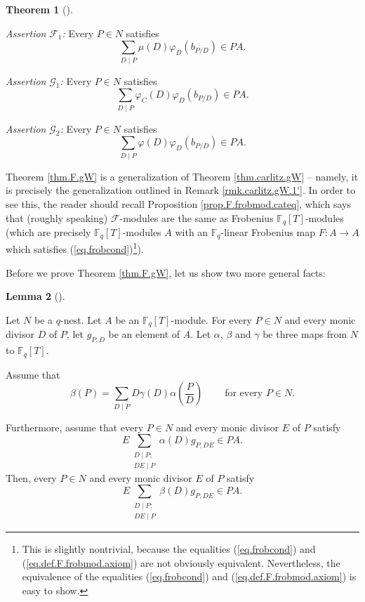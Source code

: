 \documentclass[numbers=enddot,12pt,final,onecolumn,notitlepage]{scrartcl}%
\theoremstyle{definition}
\newtheorem{theo}{Theorem}[section]
\newenvironment{theorem}[1][]
{\begin{theo}[#1]\begin{leftbar}}
{\end{leftbar}\end{theo}}
\newtheorem{lem}[theo]{Lemma}
\newenvironment{lemma}[1][]
{\begin{lem}[#1]\begin{leftbar}}
{\end{leftbar}\end{lem}}
\let\sumnonlimits\sum
\renewcommand{\sum}{\sumnonlimits\limits}
\begin{document}
\begin{theorem}
\textit{Assertion }$\mathcal{F}_{1}$\textit{:} Every $P\in N$ satisfies%
\[
\sum_{D\mid P}\mu\left(  D\right)  \varphi_{D}\left(  b_{P / D}\right)  \in
PA.
\]


\textit{Assertion }$\mathcal{G}_{1}$\textit{:} Every $P\in N$ satisfies%
\[
\sum_{D\mid P}\varphi_{C}\left(  D\right)  \varphi_{D}\left(  b_{P /
D}\right)  \in PA.
\]


\textit{Assertion }$\mathcal{G}_{2}$\textit{:} Every $P\in N$ satisfies%
\[
\sum_{D\mid P}\varphi\left(  D\right)  \varphi_{D}\left(  b_{P/D}\right)  \in
PA.
\]

\end{theorem}

Theorem \ref{thm.F.gW} is a generalization of Theorem \ref{thm.carlitz.gW} --
namely, it is precisely the generalization outlined in Remark
\ref{rmk.carlitz.gW.1'}. In order to see this, the reader should recall
Proposition \ref{prop.F.frobmod.cateq}, which says that (roughly speaking)
$\mathcal{F}$-modules are the same as Frobenius $\mathbb{F}_{q}\left[
T\right]  $-modules (which are precisely $\mathbb{F}_{q}\left[  T\right]
$-modules $A$ with an $\mathbb{F}_{q}$-linear Frobenius map $F:A\rightarrow A$
which satisfies (\ref{eq.frobcond})\footnote{This is slightly nontrivial,
because the equalities (\ref{eq.frobcond}) and (\ref{eq.def.F.frobmod.axiom})
are not obviously equivalent. Nevertheless, the equivalence of the equalities
(\ref{eq.frobcond}) and (\ref{eq.def.F.frobmod.axiom}) is easy to show.}).

Before we prove Theorem \ref{thm.F.gW}, let us show two more general facts:

\begin{lemma}
\label{lem.F.gW.F-G-gen0}Let $N$ be a $q$-nest. Let $A$ be an $\mathbb{F}%
_{q}\left[  T\right]  $-module. For every $P\in N$ and every monic divisor $D$
of $P$, let $g_{P,D}$ be an element of $A$. Let $\alpha$, $\beta$ and $\gamma$
be three maps from $N$ to $\mathbb{F}_{q}\left[  T\right]  $.

Assume that
\begin{equation}
\beta\left(  P\right)  =\sum_{D\mid P}D\gamma\left(  D\right)  \alpha\left(
\dfrac{P}{D}\right)  \ \ \ \ \ \ \ \ \ \ \text{for every }P\in N.
\label{eq.lem.F.gW.F-gen0.beta-through-alpha}%
\end{equation}


Furthermore, assume that every $P\in N$ and every monic divisor $E$ of $P$
satisfy%
\begin{equation}
E\sum_{\substack{D\mid P;\\DE\mid P}}\alpha\left(  D\right)  g_{P,DE}\in PA.
\label{eq.lem.F.gW.F-G-gen0.ass}%
\end{equation}
Then, every $P\in N$ and every monic divisor $E$ of $P$ satisfy%
\begin{equation}
E\sum_{\substack{D\mid P;\\DE\mid P}}\beta\left(  D\right)  g_{P,DE}\in PA.
\label{eq.lem.F.gW.F-G-gen0.claim}%
\end{equation}

\end{lemma}
\end{document}
